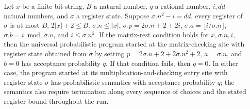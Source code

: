 \begin{lemma}
\label{Complexity.LogProg.ups_mat}
\leanok
{}
Let $x$ be a finite bit string, $B$ a natural number, $q$ a rational number, $i,dd$
natural numbers, and $\sigma$ a register state. Suppose $\sigma.n^2-i=dd$, every
register of $\sigma$ is at most $B$, $2|x|+2\le B$, $\sigma.n\le |x|$,
$\sigma.p=2\sigma.n+2+2i$, $\sigma.a=\lfloor i/\sigma.n\rfloor$,
$\sigma.b=i\bmod\sigma.n$, and $i\le\sigma.n^2$. If the matrix-rest condition holds for
$x,\sigma.n,i$, then the universal probabilistic program started at the matrix-checking
site with register state obtained from $\sigma$ by setting
$p=2\sigma.n+2+2\sigma.n^2+2$, $a=\sigma.n$, and $b=0$ has acceptance probability $q$.
If that condition fails, then $q=0$. In either case, the program started at its
multiplication-and-checking entry site with register state $\sigma$ has probabilistic
semantics with acceptance probability $q$; the semantics also require termination along
every sequence of choices and the stated register bound throughout the run.
\end{lemma}

